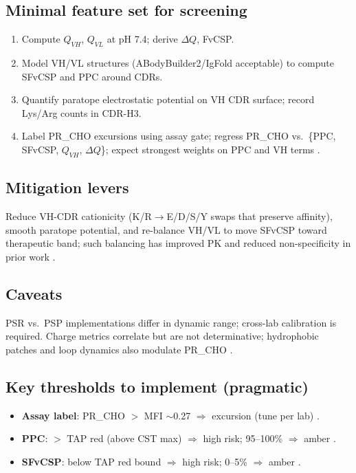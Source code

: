\subsection*{Minimal feature set for screening}
\begin{enumerate}\setlength\itemsep{2pt}
\item Compute $Q_{VH}$, $Q_{VL}$ at pH 7.4; derive $\Delta Q$, FvCSP.
\item Model VH/VL structures (ABodyBuilder2/IgFold acceptable) to compute SFvCSP and PPC around CDRs.
\item Quantify paratope electrostatic potential on VH CDR surface; record Lys/Arg counts in CDR-H3.
\item Label PR\_CHO excursions using assay gate; regress PR\_CHO vs.\ \{PPC, SFvCSP, $Q_{VH}$, $\Delta Q$\}; expect strongest weights on PPC and VH terms \cite{raybould_pnas2019, chen_cellrep2024}.
\end{enumerate}

\subsection*{Mitigation levers}
Reduce VH-CDR cationicity (K/R$\rightarrow$E/D/S/Y swaps that preserve affinity), smooth paratope potential, and re-balance VH/VL to move SFvCSP toward therapeutic band; such balancing has improved PK and reduced non-specificity in prior work \cite{datta_mannan, cunningham_review}.

\subsection*{Caveats}
PSR vs.\ PSP implementations differ in dynamic range; cross-lab calibration is required. Charge metrics correlate but are not determinative; hydrophobic patches and loop dynamics also modulate PR\_CHO \cite{makowski_psp, jain_review2024}.

\subsection*{Key thresholds to implement (pragmatic)}
\begin{itemize}\setlength\itemsep{2pt}
\item \textbf{Assay label}: PR\_CHO $>$ MFI $\sim$0.27 $\Rightarrow$ excursion (tune per lab) \cite{makowski_thesis}.
\item \textbf{PPC}: $>$ TAP red (above CST max) $\Rightarrow$ high risk; 95–100\% $\Rightarrow$ amber \cite{tap_site, raybould_ctx2024}.
\item \textbf{SFvCSP}: below TAP red bound $\Rightarrow$ high risk; 0–5\% $\Rightarrow$ amber \cite{raybould_pnas2019, deane_qsar}.
\end{itemize}

